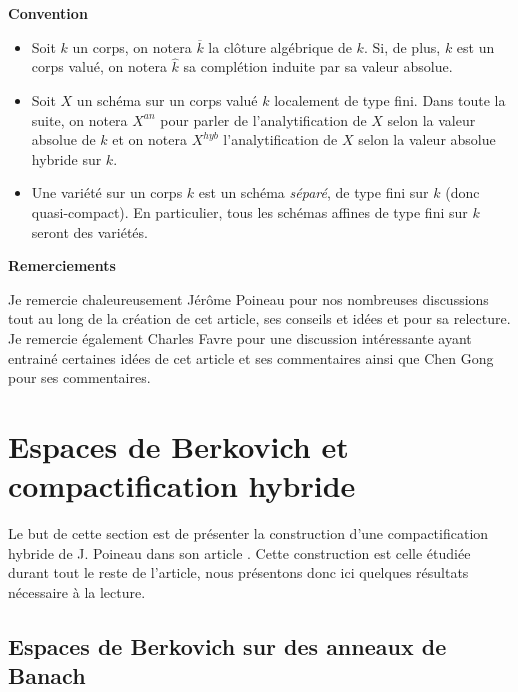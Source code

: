 \documentclass[11pt]{article}
\begin{document}
\begin{center}
\textbf{Convention}
\end{center}

\begin{itemize}
\item Soit $k$ un corps, on notera $\overline{k}$ la clôture algébrique de $k$. Si, de plus, $k$ est un corps valué, on notera $\hat{k}$ sa complétion induite par sa valeur absolue.

\item Soit $X$ un schéma sur un corps valué $k$ localement de type fini. Dans toute la suite, on notera $X^{an}$ pour parler de l'analytification de $X$ selon la valeur absolue de $k$ et on notera $X^{hyb}$ l'analytification de $X$ selon la valeur absolue hybride sur $k$.

\item Une variété sur un corps $k$ est un schéma \textit{séparé}, de type fini sur $k$ (donc quasi-compact). En particulier, tous les schémas affines de type fini sur $k$ seront des variétés.


\end{itemize}


\begin{center}
\textbf{Remerciements}
\end{center}

Je remercie chaleureusement Jérôme Poineau pour nos nombreuses discussions tout au long de la création de cet article, ses conseils et idées et pour sa relecture. Je remercie également Charles Favre pour une discussion intéressante ayant entrainé certaines idées de cet article et ses commentaires ainsi que Chen Gong pour ses commentaires. 

\section{Espaces de Berkovich et compactification hybride}\label{sectionEspacesBerko}

Le but de cette section est de présenter la construction d'une compactification hybride de J. Poineau dans son article \cite{PoineauCompactificationHybride}. Cette construction est celle étudiée durant tout le reste de l'article, nous présentons donc ici quelques résultats nécessaire à la lecture. 
\subsection{Espaces de Berkovich sur des anneaux de Banach}
\end{document}
